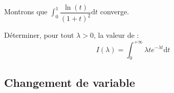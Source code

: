 \documentclass[french,11pt,twoside]{VcCours}
\newcommand{\dt}{\text{d}t}
\begin{document}
\begin{Exemple} Montrons que $\int_{0}^1  \dfrac{\ln(t)}{(1+t)^2} \dt$ converge.

%

\vspace{12cm}
\end{Exemple}

\begin{ApplicationDirecte}{} Déterminer, pour tout $\lambda>0$, la valeur de :
$$ I(\lambda) = \int_{0}^{+ \infty} \lambda t e^{-\lambda t} \dt$$
\end{ApplicationDirecte}

\subsection{Changement de variable}
\end{document}
